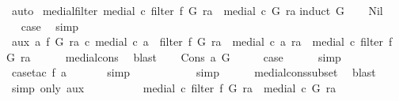 \begin{isabellebody}
\ auto%
\endisatagproof
{\isafoldproof}%
%
\isadelimproof
\isanewline
%
\endisadelimproof
\isanewline
{}\isamarkupfalse%
\ medial{\isacharunderscore}filter{\isacharcolon}\ {\isachardoublequoteopen}medial\ c\ {\isacharparenleft}filter\ f\ G{\isacharparenright}\ ra\ {\isacharbar}{\isasymsubseteq}{\isacharbar}\ medial\ c\ G\ ra{\isachardoublequoteclose}\isanewline
%
\isadelimproof
%
\endisadelimproof
%
\isatagproof
{}\isamarkupfalse%
{\isacharparenleft}induct\ G{\isacharparenright}\isanewline
\ \ \isamarkupfalse%
\ Nil\isanewline
\ \ \isamarkupfalse%
\ \isamarkupfalse%
\ {\isacharquery}case\ \isamarkupfalse%
\ simp\isanewline
{}\isamarkupfalse%
\isanewline
\ \ \isamarkupfalse%
\ aux{}{\isacharcolon}\ {\isachardoublequoteopen}{\isasymforall}a\ f\ G\ ra\ c{\isachardot}\ medial\ c\ {\isacharparenleft}a\ {\isacharhash}\ filter\ f\ G{\isacharparenright}\ ra\ {\isacharequal}\ medial\ c\ {\isacharbrackleft}a{\isacharbrackright}\ ra\ {\isacharbar}{\isasymunion}{\isacharbar}\ medial\ c\ {\isacharparenleft}filter\ f\ G{\isacharparenright}\ ra{\isachardoublequoteclose}\isanewline
\ \ \ \ \isamarkupfalse%
\ medial{\isacharunderscore}cons\ \isamarkupfalse%
\ blast\isanewline
\ \ \isamarkupfalse%
\ {\isacharparenleft}Cons\ a\ G{\isacharparenright}\isanewline
\ \ \isamarkupfalse%
\ \isamarkupfalse%
\ {\isacharquery}case\isanewline
\ \ \ \ \isamarkupfalse%
\ simp\isanewline
\ \ \ \ \isamarkupfalse%
\ {\isacharparenleft}case{\isacharunderscore}tac\ {\isachardoublequoteopen}f\ a{\isachardoublequoteclose}{\isacharparenright}\isanewline
\ \ \ \ \ \isamarkupfalse%
\ simp\isanewline
\ \ \ \ \ \isamarkupfalse%
\isanewline
\ \ \ \ \isamarkupfalse%
\ simp\isanewline
\ \ \ \ \isamarkupfalse%
\ medial{\isacharunderscore}cons{\isacharunderscore}subset\ \isamarkupfalse%
\ blast\isanewline
\ \ \ \ \isamarkupfalse%
\ {\isacharparenleft}simp\ only{\isacharcolon}\ aux{}{\isacharparenright}\isanewline
\ \ \isamarkupfalse%
\ {\isacharminus}\isanewline
\ \ \ \ \isamarkupfalse%
\ {\isachardoublequoteopen}medial\ c\ {\isacharparenleft}filter\ f\ G{\isacharparenright}\ ra\ {\isacharbar}{\isasymsubseteq}{\isacharbar}\ medial\ c\ G\ ra{\isachardoublequoteclose}\isanewline
\ \ \ \ \isamarkupfalse%

\end{isabellebody}
